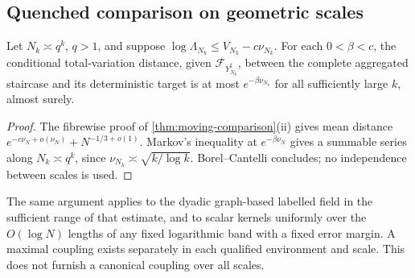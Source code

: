 \subsection{Quenched comparison on geometric scales}
\begin{corollary}\label{cor:quenched}
Let $N_k\asymp q^k$, $q>1$, and suppose
$\log\Lambda_{N_k}\le V_{N_k}-c\nu_{N_k}$.
For each $0<\beta<c$, the conditional total-variation distance, given
$\mathcal F_{Y_{N_k}^\sharp}$, between the complete aggregated staircase
and its deterministic target is at most $e^{-\beta\nu_{N_k}}$ for all
sufficiently large $k$, almost surely.
\end{corollary}
\begin{proof}
The fibrewise proof of \cref{thm:moving-comparison}(ii) gives mean distance
$e^{-c\nu_N+o(\nu_N)}+N^{-1/3+o(1)}$.
Markov's inequality at $e^{-\beta\nu_N}$ gives a summable series along
$N_k\asymp q^k$, since $\nu_{N_k}\asymp\sqrt{k/\log k}$.
Borel--Cantelli concludes; no independence between scales is used.
\end{proof}
The same argument applies to the dyadic graph-based labelled field in
the sufficient range of that estimate, and to scalar kernels uniformly over the $O(\log N)$
lengths of any fixed logarithmic band with a fixed error margin.
A maximal coupling exists separately in each qualified environment and
scale. This does not furnish a canonical coupling over all scales.
